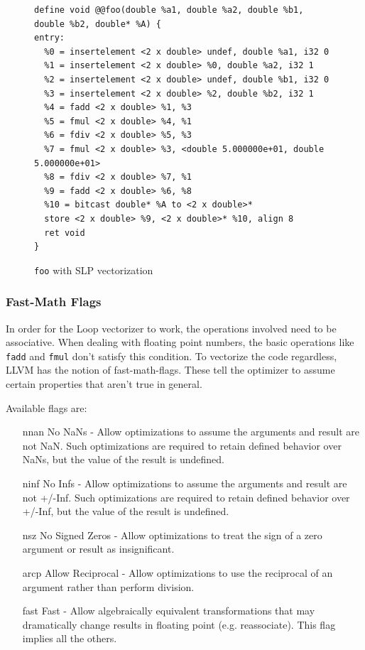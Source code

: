 \documentclass[a4paper,bibliography=totocnumbered,parskip,headsepline]{scrbook}
\begin{document}
\begin{figure}
\begin{lstlisting}
define void @@foo(double %a1, double %a2, double %b1, double %b2, double* %A) {
entry:
  %0 = insertelement <2 x double> undef, double %a1, i32 0
  %1 = insertelement <2 x double> %0, double %a2, i32 1
  %2 = insertelement <2 x double> undef, double %b1, i32 0
  %3 = insertelement <2 x double> %2, double %b2, i32 1
  %4 = fadd <2 x double> %1, %3
  %5 = fmul <2 x double> %4, %1
  %6 = fdiv <2 x double> %5, %3
  %7 = fmul <2 x double> %3, <double 5.000000e+01, double 5.000000e+01>
  %8 = fdiv <2 x double> %7, %1
  %9 = fadd <2 x double> %6, %8
  %10 = bitcast double* %A to <2 x double>*
  store <2 x double> %9, <2 x double>* %10, align 8
  ret void
}
\end{lstlisting}
\caption{\lstinline{foo} with SLP vectorization}
\label{fig:slpll2}
\end{figure}

\subsubsection{Fast-Math Flags}
In order for the Loop vectorizer to work, the operations involved need to be associative.
When dealing with floating point numbers, the basic operations like \lstinline{fadd} and \lstinline{fmul} don't satisfy this condition.
To vectorize the code regardless, LLVM has the notion of fast-math-flags.
These tell the optimizer to assume certain properties that aren't true in general.

Available flags are\cite{llvmref}:
\begin{itemize}
\item[nnan] No NaNs - Allow optimizations to assume the arguments and result are not NaN. Such optimizations are required to retain defined behavior over NaNs, but the value of the result is undefined.
\item[ninf] No Infs - Allow optimizations to assume the arguments and result are not +/-Inf. Such optimizations are required to retain defined behavior over +/-Inf, but the value of the result is undefined.
\item[nsz] No Signed Zeros - Allow optimizations to treat the sign of a zero argument or result as insignificant.
\item[arcp] Allow Reciprocal - Allow optimizations to use the reciprocal of an argument rather than perform division.
\item[fast] Fast - Allow algebraically equivalent transformations that may dramatically change results in floating point (e.g. reassociate). This flag implies all the others.
\end{itemize}
\end{document}
